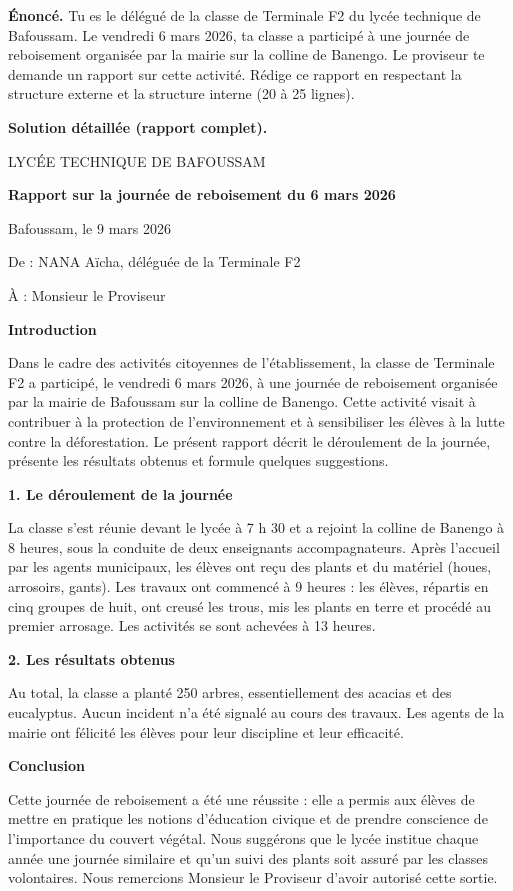 \documentclass[11pt]{article}
\begin{document}
\begin{exoresolu}
\textbf{Énoncé.} Tu es le délégué de la classe de Terminale F2 du lycée technique de Bafoussam. Le vendredi 6 mars 2026, ta classe a participé à une journée de reboisement organisée par la mairie sur la colline de Banengo. Le proviseur te demande un rapport sur cette activité. Rédige ce rapport en respectant la structure externe et la structure interne (20 à 25 lignes).

\tcblower
\textbf{Solution détaillée (rapport complet).}

LYCÉE TECHNIQUE DE BAFOUSSAM

\textbf{Rapport sur la journée de reboisement du 6 mars 2026}

Bafoussam, le 9 mars 2026

De : NANA Aïcha, déléguée de la Terminale F2

À : Monsieur le Proviseur

\textbf{Introduction}

Dans le cadre des activités citoyennes de l'établissement, la classe de Terminale F2 a participé, le vendredi 6 mars 2026, à une journée de reboisement organisée par la mairie de Bafoussam sur la colline de Banengo. Cette activité visait à contribuer à la protection de l'environnement et à sensibiliser les élèves à la lutte contre la déforestation. Le présent rapport décrit le déroulement de la journée, présente les résultats obtenus et formule quelques suggestions.

\textbf{1. Le déroulement de la journée}

La classe s'est réunie devant le lycée à 7 h 30 et a rejoint la colline de Banengo à 8 heures, sous la conduite de deux enseignants accompagnateurs. Après l'accueil par les agents municipaux, les élèves ont reçu des plants et du matériel (houes, arrosoirs, gants). Les travaux ont commencé à 9 heures : les élèves, répartis en cinq groupes de huit, ont creusé les trous, mis les plants en terre et procédé au premier arrosage. Les activités se sont achevées à 13 heures.

\textbf{2. Les résultats obtenus}

Au total, la classe a planté 250 arbres, essentiellement des acacias et des eucalyptus. Aucun incident n'a été signalé au cours des travaux. Les agents de la mairie ont félicité les élèves pour leur discipline et leur efficacité.

\textbf{Conclusion}

Cette journée de reboisement a été une réussite : elle a permis aux élèves de mettre en pratique les notions d'éducation civique et de prendre conscience de l'importance du couvert végétal. Nous suggérons que le lycée institue chaque année une journée similaire et qu'un suivi des plants soit assuré par les classes volontaires. Nous remercions Monsieur le Proviseur d'avoir autorisé cette sortie.


\end{exoresolu}
\end{document}
